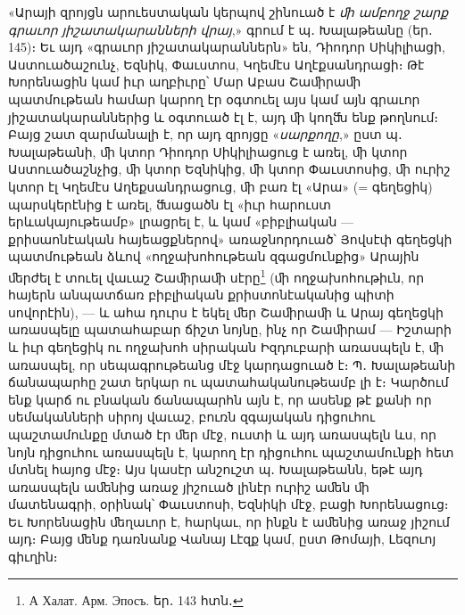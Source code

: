 \documentclass{article}
\begin{document}
{«Արայի զրոյցն արուեստական կերպով շինուած է \emph{ﬕ ամբողջ շարք գրաւոր յիշատակարանների վրայ},» գրում է պ․ Խալաթեանը (եր․ 145)։ Եւ այդ «գրաւոր յիշատակարաններն» են, Դիոդոր Սիկիլիացի, Աստուածաշունչ, Եզնիկ, Փաւստոս, Կղեմէս Աղէքսանդրացի։ Թէ Խորենացին կամ իւր աղբիւրը՝ Մար Աբաս Շաﬕրաﬕ պատմութեան համար կարող էր օգտուել այս կամ այն գրաւոր յիշատակարաններից և օգտուած էլ է, այդ ﬕ կողﬓ ենք թողնում։ Բայց շատ զարմանալի է, որ այդ զրոյցը «\emph{սարքողը},» ըստ պ․ Խալաթեանի, ﬕ կտոր Դիոդոր Սիկիլիացուց է առել, ﬕ կտոր Աստուածաշնչից, ﬕ կտոր Եզնիկից, ﬕ կտոր Փաւստոսից, ﬕ ուրիշ կտոր էլ Կղեմէս Աղեքսանդրացուց, ﬕ բառ էլ «Արա» (= գեղեցիկ) պարսկերէնից է առել, ﬓացածն էլ «իւր հարուստ երևակայութեամբ» լրացրել է, և կամ «բիբլիական — քրիսաոնէական հայեացքներով» առաջնորդուած՝ Յովսէփ գեղեցկի պատմութեան ձևով «ողջախոհութեան զգացմունքից» Արային ﬔրժել է տուել վաւաշ Շաﬕրաﬕ սէրը\footnote{А Халат. Арм. Эпосъ. եր․ 143 հտն․} (ﬕ ողջախոհութիւն, որ հայերն անպատճառ բիբլիական քրիստոնէականից պիտի սովորէին), — և ահա դուրս է եկել ﬔր Շաﬕրաﬕ և Արայ գեղեցկի առասպելը պատահաբար ճիշտ նոյնը, ինչ որ Շաﬕրամ — Իշտարի և իւր գեղեցիկ ու ողջախոհ սիրական Իզդուբարի առասպելն է, ﬕ առասպել, որ սեպագրութեանց մէջ կարդացուած է։ Պ․ Խալաթեանի ճանապարհը շատ երկար ու պատահականութեամբ լի է։ Կարծում ենք կարճ ու բնական ճանապարհն այն է, որ ասենք թէ քանի որ սեմականների սիրոյ վաւաշ, բուռն զգայական դիցուհու պաշտամունքը մտած էր ﬔր մէջ, ուստի և այդ առասպելն ևս, որ նոյն դիցուհու առասպելն է, կարող էր դիցուհու պաշտամունքի հետ մտնել հայոց մէջ։ Այս կասէր անշուշտ պ․ Խալաթեանն, եթէ այդ առասպելն աﬔնից առաջ յիշուած լինէր ուրիշ աﬔն ﬕ մատենագրի, օրինակ՝ Փաւստոսի, Եզնիկի մէջ, բացի Խորենացուց։ Եւ Խորենացին ﬔղաւոր է, հարկաւ, որ ինքն է աﬔնից առաջ յիշում այդ։ Բայց ﬔնք դառնանք Վանայ Լէզք կամ, ըստ Թոմայի, Լեզուոյ գիւղին։

}
\end{document}
